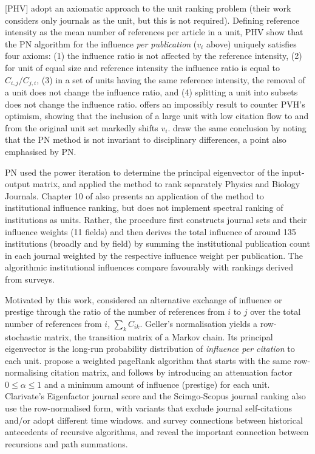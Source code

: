 \documentclass[10pt]{article}
\begin{document}
\cite{palacios-huertaMeasurementIntellectualInfluence2004} [PHV] adopt an axiomatic approach to the unit ranking problem (their work considers only journals as the unit, but this is not required). Defining reference intensity as the mean number of references per article in a unit, PHV show that the PN algorithm for the influence \textit{per publication} ($v_i$ above) uniquely satisfies four axioms: (1) the influence ratio is not affected by the reference intensity, (2) for unit of equal size and reference intensity the influence ratio is equal to $C_{i,j}/C_{j,i}$, (3) in a set of units having the same reference intensity, the removal of a unit does not change the influence ratio, and (4) splitting a unit into subsets does not change the influence ratio. \cite{serranoMeasurementIntellectualInfluence2004} offers an impossibly result to counter PVH's optimism, showing that the inclusion of a large unit with low citation flow to and from the original unit set markedly shifts $v_i$. \cite{waltmanRelationEigenfactorAudience2010} draw the same conclusion by noting that the PN method is not invariant to disciplinary differences, a point also emphasised by PN.

PN used the power iteration to determine the principal eigenvector of the input-output matrix, and applied the method to rank separately Physics and Biology Journals. Chapter 10 of \cite{narinEVALUATIVEBIBLIOMETRICSUSE1976} also presents an application of the method to institutional influence ranking, but does not implement spectral ranking of institutions as units. Rather, the procedure first constructs journal sets and their influence weights (11 fields) and then derives the total influence of around 135 institutions (broadly and by field) by summing the institutional publication count in each journal weighted by the respective influence weight per publication. The algorithmic institutional influences compare favourably with rankings derived from surveys.

Motivated by this work, \cite{gellerCitationInfluenceMethodology1978} considered an alternative exchange of influence or prestige through the ratio of the number of references from $i$ to $j$ over the total number of references from $i$, $\sum_k C_{ik}$. Geller's normalisation yields a row-stochastic matrix, the transition matrix of a Markov chain. Its principal eigenvector is the long-run probability distribution of \textit{influence per citation} to each unit. \cite{bollenJournalStatus2006a} propose a weighted pageRank algorithm that starts with the same row-normalising citation matrix, and follows \cite{pageMethodNodeRanking1998} by introducing an attenuation factor $0 \le \alpha \le 1$ and a minimum amount of influence (prestige) for each unit. Clarivate's Eigenfactor journal score \citep{bergstromEigenfactorMeasuringValue2007, westEigenfactorMetricsNetwork2010} and the Scimgo-Scopus journal ranking \citep{gonzalez-pereiraNewApproachMetric2010,guerrero-boteFurtherStepForward2012} also use the row-normalised form, with variants that exclude journal self-citations and/or adopt different time windows. \cite{vigna} and \cite{waltmanRelationEigenfactorAudience2010} survey connections between historical antecedents of recursive algorithms, and reveal the important connection between recursions and path summations.
\end{document}
